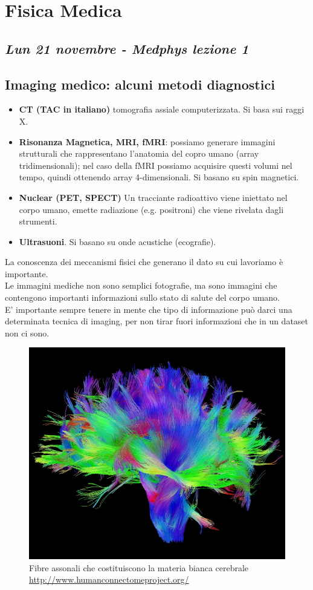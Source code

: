 \chapter{Fisica Medica}


\section{\textit{Lun 21 novembre - Medphys lezione 1}}
\section{Imaging medico: alcuni metodi diagnostici}

\begin{itemize}
	\item \textbf{CT (TAC in italiano)} tomografia assiale computerizzata. Si basa sui raggi X.
	\item \textbf{Risonanza Magnetica, MRI, fMRI}: possiamo generare immagini strutturali che rappresentano l'anatomia del copro umano (array tridimensionali); nel caso della fMRI possiamo acquisire questi volumi nel tempo, quindi ottenendo array 4-dimensionali.  Si basano su spin magnetici.
	\item \textbf{Nuclear (PET, SPECT)} Un tracciante radioattivo viene iniettato nel corpo umano, emette radiazione (e.g. positroni) che viene rivelata dagli strumenti.
	\item \textbf{Ultrasuoni}. Si basano su onde acustiche (ecografie).
\end{itemize}

La conoscenza dei meccanismi fisici che generano il dato su cui lavoriamo è importante.\\
Le immagini mediche non sono semplici fotografie, ma sono immagini che contengono importanti informazioni sullo stato di salute del corpo umano.\\ E' importante sempre tenere in mente che tipo di informazione può darci una determinata tecnica di imaging, per non tirar fuori informazioni che in un dataset non ci sono.

\begin{figure}[ht]
	\centering
	\includegraphics[width=0.45\linewidth]{figure_med/White-Matter-Fibers.jpg}
	\caption{Fibre assonali che costituiscono la materia bianca cerebrale \url{http://www.humanconnectomeproject.org/}}
\end{figure}
\FloatBarrier

